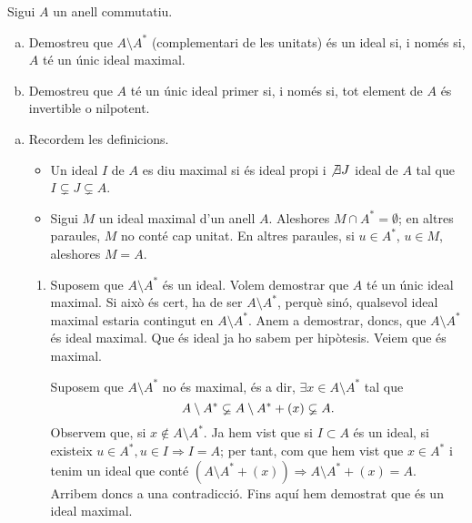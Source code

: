 \documentclass[../main.tex]{subfiles}
\begin{document}
\setcounter{exercici}{29}
\begin{exercici}
\label{esal30} Sigui $A$ un anell commutatiu.
\begin{enumerate}[(a)]
    \item Demostreu que $A\setminus A^*$ (complementari de les unitats) és un ideal si, i només si, $A$ té un únic ideal maximal.
    \item Demostreu que $A$ té un únic ideal primer si, i només si, tot element de $A$ és invertible o nilpotent.
\end{enumerate}
\end{exercici}
\begin{sol}
\begin{enumerate}[(a)]
    \item Recordem les definicions.
    \begin{itemize}
        \item Un ideal $I$ de $A$ es diu maximal si és ideal propi i $\not\exists J$ ideal de $A$ tal que $I\varsubsetneq J\varsubsetneq A$.
        \item Sigui $M$ un ideal maximal d'un anell $A$. Aleshores $M\cap A^* = \emptyset$; en altres paraules, $M$ no conté cap unitat. En altres paraules, si $u\in A^*$, $u\in M$, aleshores $M=A$.
    \end{itemize}
    
    \begin{enumerate}[($\Rightarrow$)]
        \item Suposem que $A\setminus A^*$ és un ideal. Volem demostrar que $A$ té un únic ideal maximal. Si això és cert, ha de ser $A\setminus A^*$, perquè sinó, qualsevol ideal maximal estaria contingut en $A\setminus A^*$. Anem a demostrar, doncs, que $A\setminus A^*$ és ideal maximal. Que és ideal ja ho sabem per hipòtesis. Veiem que és maximal.
        
        Suposem que $A\setminus A^*$ no és maximal, és a dir, $\exists x\in A\setminus A^*$ tal que 
        \begin{equation}
            \notag
            A\setminus A^*\varsubsetneq A\setminus A^*+(x)\varsubsetneq A.
        \end{equation}
        Observem que, si $x\not\in A\setminus A^*$. Ja hem vist que si $I\subset A$ és un ideal, si existeix $u\in A^*,u\in I\Rightarrow I=A$; per tant, com que hem vist que $x\in A^*$ i tenim un ideal que conté $(A\setminus A^*+(x))\Rightarrow A\setminus A^*+(x) = A$. Arribem doncs a una contradicció. Fins aquí hem demostrat que és un ideal maximal.
        

\end{enumerate}
\end{enumerate}
\end{sol}
\end{document}

